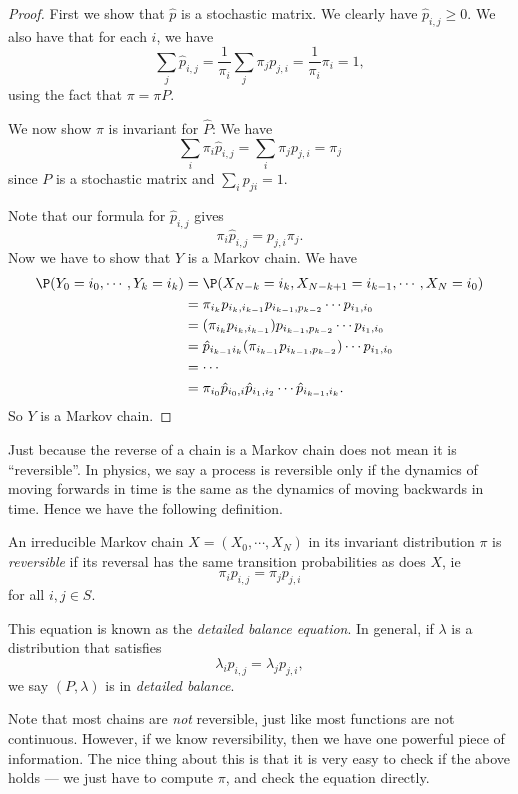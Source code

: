 \documentclass[a4paper]{article}
\begin{document}
\begin{proof}
  First we show that $\hat{p}$ is a stochastic matrix. We clearly have $\hat{p}_{i,j} \geq 0$. We also have that for each $i$, we have
  \[
    \sum_j \hat{p}_{i, j} = \frac{1}{\pi_i} \sum_j \pi_j p_{j, i} = \frac{1}{\pi_i} \pi_i = 1,
  \]
  using the fact that $\pi = \pi P$.

  We now show $\pi$ is invariant for $\hat{P}$: We have
  \[
    \sum_i \pi_i \hat{p}_{i, j} = \sum_i \pi_j p_{j, i} = \pi_j
  \]
  since $P$ is a stochastic matrix and $\sum_i p_{ji} = 1$.

  Note that our formula for $\hat{p}_{i,j}$ gives
  \[
    \pi_i \hat{p}_{i, j} = p_{j, i} \pi_j.
  \]
  Now we have to show that $Y$ is a Markov chain. We have
  \begin{align*}
    \P(Y_0 = i_0, \cdots, Y_k = i_k) &= \P(X_{N - k} = i_k, X_{N - k + 1} = i_{k - 1}, \cdots, X_N = i_0)\\
    &= \pi_{i_k} p_{i_k, i_{k - 1}} p_{i_{k - 1}, p_{k - 2}} \cdots p_{i_1, i_0}\\
    &= (\pi_{i_k} p_{i_k, i_{k - 1}}) p_{i_{k - 1}, p_{k - 2}} \cdots p_{i_1, i_0}\\
    &= \hat{p}_{i_{k - 1} i_k} (\pi_{i_{k - 1}} p_{i_{k - 1}, p_{k - 2}}) \cdots p_{i_1, i_0}\\
    &= \cdots\\
    &= \pi_{i_0} \hat{p}_{i_0, i} \hat{p}_{i_1, i_2} \cdots \hat{p}_{i_{k - 1}, i_k}.
  \end{align*}
  So $Y$ is a Markov chain.
\end{proof}

Just because the reverse of a chain is a Markov chain does not mean it is ``reversible''. In physics, we say a process is reversible only if the dynamics of moving forwards in time is the same as the dynamics of moving backwards in time. Hence we have the following definition.

\begin{defi}
  An irreducible Markov chain $X = (X_0, \cdots, X_N)$ in its invariant distribution $\pi$ is \emph{reversible} if its reversal has the same transition probabilities as does $X$, ie
  \[
    \pi_i p_{i, j} = \pi_j p_{j, i}
  \]
  for all $i, j \in S$.

  This equation is known as the \emph{detailed balance equation}. In general, if $\lambda$ is a distribution that satisfies
  \[
    \lambda_i p_{i, j} = \lambda_j p_{j, i},
  \]
  we say $(P, \lambda)$ is in \emph{detailed balance}.
\end{defi}
Note that most chains are \emph{not} reversible, just like most functions are not continuous. However, if we know reversibility, then we have one powerful piece of information. The nice thing about this is that it is very easy to check if the above holds --- we just have to compute $\pi$, and check the equation directly.
\end{document}
